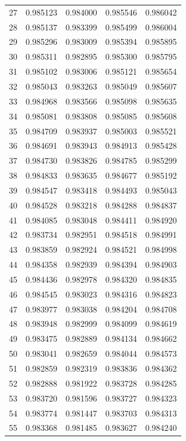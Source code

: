 \begin{table}
\begin{tabular}{rrrrr}
27 & 0.985123 & 0.984000 & 0.985546 & 0.986042 \\
28 & 0.985137 & 0.983399 & 0.985499 & 0.986004 \\
29 & 0.985296 & 0.983009 & 0.985394 & 0.985895 \\
30 & 0.985311 & 0.982895 & 0.985300 & 0.985795 \\
31 & 0.985102 & 0.983006 & 0.985121 & 0.985654 \\
32 & 0.985043 & 0.983263 & 0.985049 & 0.985607 \\
33 & 0.984968 & 0.983566 & 0.985098 & 0.985635 \\
34 & 0.985081 & 0.983808 & 0.985085 & 0.985608 \\
35 & 0.984709 & 0.983937 & 0.985003 & 0.985521 \\
36 & 0.984691 & 0.983943 & 0.984913 & 0.985428 \\
37 & 0.984730 & 0.983826 & 0.984785 & 0.985299 \\
38 & 0.984833 & 0.983635 & 0.984677 & 0.985192 \\
39 & 0.984547 & 0.983418 & 0.984493 & 0.985043 \\
40 & 0.984528 & 0.983218 & 0.984288 & 0.984837 \\
41 & 0.984085 & 0.983048 & 0.984411 & 0.984920 \\
42 & 0.983734 & 0.982951 & 0.984518 & 0.984991 \\
43 & 0.983859 & 0.982924 & 0.984521 & 0.984998 \\
44 & 0.984358 & 0.982939 & 0.984394 & 0.984903 \\
45 & 0.984436 & 0.982978 & 0.984320 & 0.984835 \\
46 & 0.984545 & 0.983023 & 0.984316 & 0.984823 \\
47 & 0.983977 & 0.983038 & 0.984204 & 0.984708 \\
48 & 0.983948 & 0.982999 & 0.984099 & 0.984619 \\
49 & 0.983475 & 0.982889 & 0.984134 & 0.984662 \\
50 & 0.983041 & 0.982659 & 0.984044 & 0.984573 \\
51 & 0.982859 & 0.982319 & 0.983836 & 0.984362 \\
52 & 0.982888 & 0.981922 & 0.983728 & 0.984285 \\
53 & 0.983720 & 0.981596 & 0.983727 & 0.984323 \\
54 & 0.983774 & 0.981447 & 0.983703 & 0.984313 \\
55 & 0.983368 & 0.981485 & 0.983627 & 0.984240 \\

\end{tabular}
\end{table}
